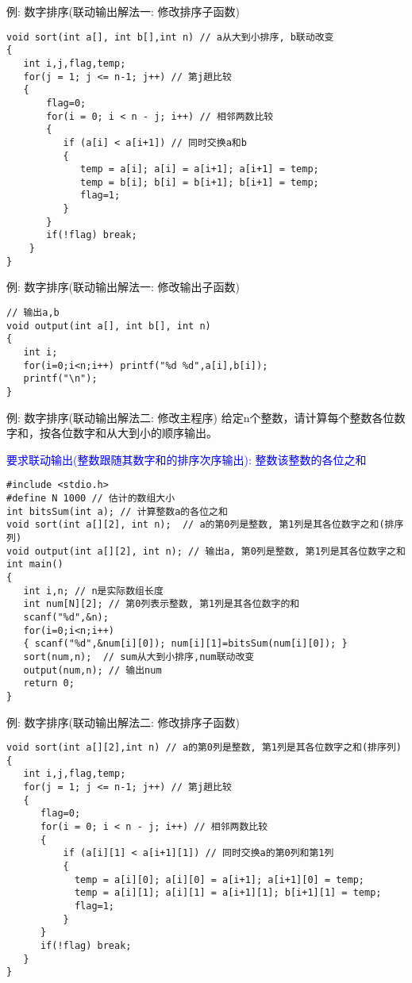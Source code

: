 \begin{frame}{例: 数字排序(联动输出解法一: 修改排序子函数)}
\vspace{-0.3cm}
\begin{lstlisting}
void sort(int a[], int b[],int n) // a从大到小排序, b联动改变
{
   int i,j,flag,temp;
   for(j = 1; j <= n-1; j++) // 第j趟比较
   {
       flag=0;
       for(i = 0; i < n - j; i++) // 相邻两数比较
       {
          if (a[i] < a[i+1]) // 同时交换a和b
          { 
             temp = a[i]; a[i] = a[i+1]; a[i+1] = temp; 
             temp = b[i]; b[i] = b[i+1]; b[i+1] = temp; 
             flag=1;
          }
       }
       if(!flag) break;
    }
}
\end{lstlisting}
\end{frame}

\begin{frame}{例: 数字排序(联动输出解法一: 修改输出子函数)}
\begin{lstlisting}
// 输出a,b
void output(int a[], int b[], int n)
{
   int i;
   for(i=0;i<n;i++) printf("%d %d",a[i],b[i]);
   printf("\n");
}
\end{lstlisting}
\end{frame}

\begin{frame}{例: 数字排序(联动输出解法二: 修改主程序)}
\vspace{-0.2cm}
给定n个整数，请计算每个整数各位数字和，按各位数字和从大到小的顺序输出。

\textcolor{blue}{要求联动输出(整数跟随其数字和的排序次序输出): 整数\quad 该整数的各位之和}
\vspace{-0.2cm}
\begin{lstlisting}
#include <stdio.h>
#define N 1000 // 估计的数组大小
int bitsSum(int a); // 计算整数a的各位之和
void sort(int a[][2], int n);  // a的第0列是整数, 第1列是其各位数字之和(排序列)
void output(int a[][2], int n); // 输出a, 第0列是整数, 第1列是其各位数字之和
int main()
{
   int i,n; // n是实际数组长度 
   int num[N][2]; // 第0列表示整数, 第1列是其各位数字的和  
   scanf("%d",&n);
   for(i=0;i<n;i++) 
   { scanf("%d",&num[i][0]); num[i][1]=bitsSum(num[i][0]); }
   sort(num,n);  // sum从大到小排序,num联动改变
   output(num,n); // 输出num
   return 0;
}
\end{lstlisting}
\end{frame}

\begin{frame}{例: 数字排序(联动输出解法二: 修改排序子函数)}
\vspace{-0.3cm}
\begin{lstlisting}
void sort(int a[][2],int n) // a的第0列是整数, 第1列是其各位数字之和(排序列)
{
   int i,j,flag,temp;
   for(j = 1; j <= n-1; j++) // 第j趟比较
   {
      flag=0;
      for(i = 0; i < n - j; i++) // 相邻两数比较
      {
          if (a[i][1] < a[i+1][1]) // 同时交换a的第0列和第1列
          { 
            temp = a[i][0]; a[i][0] = a[i+1]; a[i+1][0] = temp; 
            temp = a[i][1]; a[i][1] = a[i+1][1]; b[i+1][1] = temp; 
            flag=1;
          }
      }
      if(!flag) break;
   }
}
\end{lstlisting}
\end{frame}

